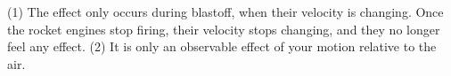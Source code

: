 (1) The effect only occurs during blastoff, when their velocity is changing. Once
 the rocket engines stop firing, their
velocity stops changing, and they no longer feel any effect. (2) It
 is only an observable effect of your motion relative
to the air.




